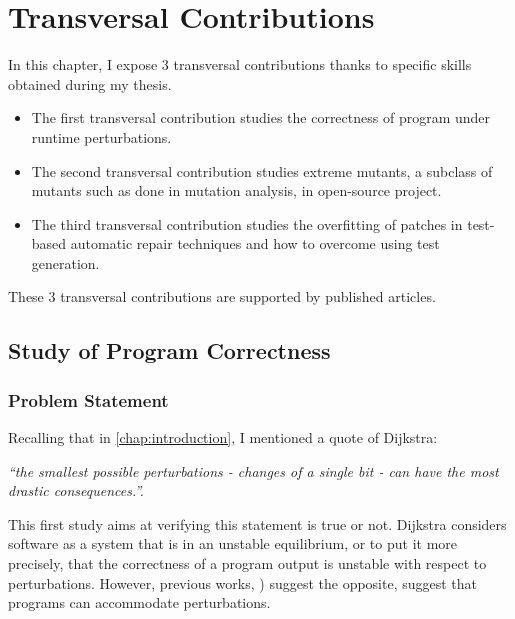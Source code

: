 \chapter{Transversal Contributions}
\label{chap:transversal-contributions}

\begin{chaptersummary}
	In this chapter, I expose 3 transversal contributions thanks to specific skills obtained during my thesis.
	\begin{itemize}
		\item \cite{Danglot2018} The first transversal contribution studies the correctness of program under runtime perturbations.
		\item \cite{descartes} The second transversal contribution studies extreme mutants, \eg a subclass of mutants such as done in mutation analysis, in open-source project. 
		\item \cite{Yu2019} The third transversal contribution studies the overfitting of patches in test-based automatic repair techniques and how to overcome using test generation.
	\end{itemize}
	These 3 transversal contributions are supported by published articles.
\end{chaptersummary}

\minitoc

\graphicspath{{.}{chapitres/transversal_contributions/}}

\section{Study of Program Correctness}
\label{sec:transversal-contributions:correctness}

\subsection{Problem Statement}
\label{subsec:transversal-contributions:correctness:introduction}

Recalling that in \autoref{chap:introduction}, I mentioned a quote of Dijkstra:
\begin{center}
	\emph{``the smallest possible perturbations - \ie changes of a single bit - can have the most drastic consequences.''.}
\end{center}

This first study aims at verifying this statement is true or not.
Dijkstra considers software as a system that is in an unstable equilibrium, or to put it more precisely, that the correctness of a program output is unstable with respect to perturbations.
However, previous works, \eg\cite{Rinard:2005:EAE:1094855.1094866,Li2007Correctness}) suggest the opposite, \ie suggest that programs can accommodate perturbations.

